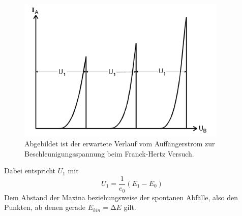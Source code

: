 \begin{figure}[H]
    \centering
    \includegraphics[width=10cm]{Bilder/Theorie.png}
    \caption{Abgebildet ist der erwartete Verlauf vom Auffängerstrom zur Beschleunigungsspannung beim Franck-Hertz Versuch.}
    \label{fig:Theorie}
\end{figure}

\noindent Dabei entspricht $U_1$ mit
\begin{equation}
    U_1=\frac{1}{e_0}(E_1-E_0)
    \label{eqn:Abstand}
\end{equation}
\noindent Dem Abstand der Maxina beziehungsweise der spontanen Abfälle, also den Punkten, ab denen gerade $E_{kin}=\increment E$ gilt.

